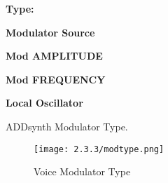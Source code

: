    \begin{enumber}
      \item \textbf{Type:}
      \item \textbf{Modulator Source}
      \item \textbf{Mod AMPLITUDE}
      \item \textbf{Mod FREQUENCY}
      \item \textbf{Local Oscillator}
   \end{enumber}

   \setcounter{ItemCounter}{0}      %

   ADDsynth Modulator Type.

\begin{figure}[H]
   \centering
     \texttt{[image: 2.3.3/modtype.png]}
   \caption{Voice Modulator Type}
   \label{fig:voice_modulator_type}
\end{figure}

